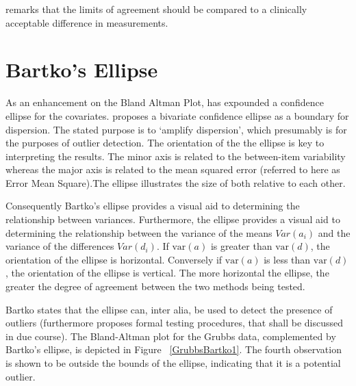 \documentclass[12pt, a4paper]{report}
\theoremstyle{plain}
\theoremstyle{definition}
\theoremstyle{remark}
\begin{document}
	\citet{Dewitte} remarks that the limits of agreement should be
	compared to a clinically acceptable difference in measurements.
	

		\section{Bartko's Ellipse}
		
		As an enhancement on the Bland Altman Plot, \citet{Bartko} has
		expounded a confidence ellipse for the covariates. \citet{Bartko} proposes
		a bivariate confidence ellipse as a boundary for dispersion. The stated purpose is to `amplify dispersion', which presumably is for  the purposes of outlier detection. The orientation of the the ellipse is key to interpreting the results. The minor axis is related to the between-item variability whereas the major axis is related to the mean squared error (referred to here as Error Mean Square).The ellipse illustrates the size of both relative to each
		other. 
		
		
		Consequently Bartko's ellipse provides a visual aid to determining the
		relationship between variances. 
		Furthermore, the ellipse provides a visual aid to determining the relationship
		between the variance of the means $Var(a_{i})$ and the variance of the differences $Var(d_{i})$. If $\mbox{var}(a)$ is greater than $\mbox{var}(d)$, the orientation of the ellipse is horizontal. Conversely if $\mbox{var}(a)$ is less than $\mbox{var}(d)$, the orientation of the ellipse is vertical. The more horizontal the ellipse, the greater the degree of agreement between the two methods being tested.
		
		
		Bartko states that the ellipse can, inter alia, be used to detect the presence of outliers (furthermore
		\citet{Bartko} proposes formal testing procedures, that shall be discussed in due course). 
		The Bland-Altman plot for the Grubbs data, complemented by Bartko's ellipse, is depicted in Figure ~\ref{GrubbsBartko1}.
		The fourth observation is shown to be outside the bounds of the ellipse, indicating that it is a potential outlier.
		
\end{document}
